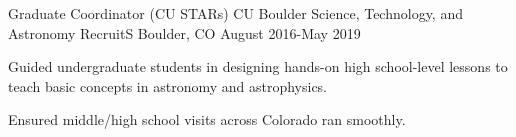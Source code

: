 

\begin{cventries}

  \cventry
    {Graduate Coordinator} %
    {(CU STARs) CU Boulder Science, Technology, and Astronomy RecruitS} %
    {Boulder, CO} %
    {August 2016-May 2019} %
    {
      \begin{cvitems} %
        \item {Guided undergraduate students in designing hands-on high school-level lessons to
				teach basic concepts in astronomy and astrophysics.}
        \item {Ensured middle/high school visits across Colorado ran smoothly.}
      \end{cvitems}
    }



\end{cventries}

